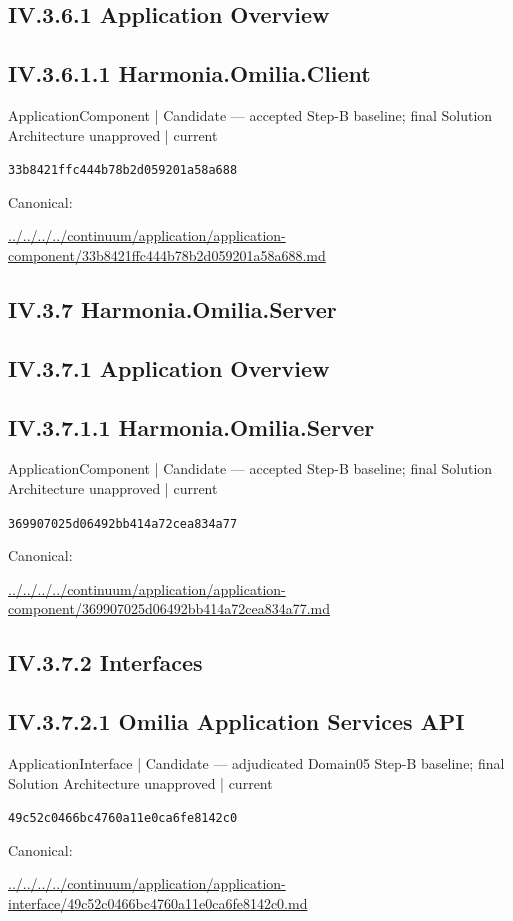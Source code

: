 \documentclass[10pt,a4paper]{article}
\begin{document}
\subsection*{IV.3.6.1 Application Overview}
\subsection*{IV.3.6.1.1 Harmonia.Omilia.Client}
{\small ApplicationComponent | Candidate — accepted Step-B baseline; final Solution Architecture unapproved | current}\par
\texttt{33b8421ffc444b78b2d059201a58a688}\par
Canonical: \par
{\footnotesize\url{../../../../continuum/application/application-component/33b8421ffc444b78b2d059201a58a688.md}}\par
\subsection*{IV.3.7 Harmonia.Omilia.Server}
\subsection*{IV.3.7.1 Application Overview}
\subsection*{IV.3.7.1.1 Harmonia.Omilia.Server}
{\small ApplicationComponent | Candidate — accepted Step-B baseline; final Solution Architecture unapproved | current}\par
\texttt{369907025d06492bb414a72cea834a77}\par
Canonical: \par
{\footnotesize\url{../../../../continuum/application/application-component/369907025d06492bb414a72cea834a77.md}}\par
\subsection*{IV.3.7.2 Interfaces}
\subsection*{IV.3.7.2.1 Omilia Application Services API}
{\small ApplicationInterface | Candidate — adjudicated Domain05 Step-B baseline; final Solution Architecture unapproved | current}\par
\texttt{49c52c0466bc4760a11e0ca6fe8142c0}\par
Canonical: \par
{\footnotesize\url{../../../../continuum/application/application-interface/49c52c0466bc4760a11e0ca6fe8142c0.md}}\par
\end{document}
